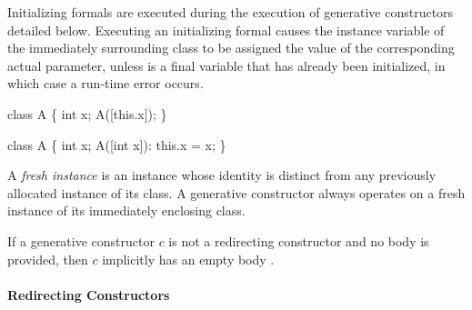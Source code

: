 \documentclass{article}
\begin{document}

\LMHash{}
Initializing formals are executed during the execution of generative constructors detailed below.
Executing an initializing formal  causes the instance variable \id{} of the immediately surrounding class to be assigned the value of the corresponding actual parameter,
unless \id{} is a final variable that has already been initialized, in which case a run-time error occurs.


\begin{dartCode}
class A \{
  int x;
  A([this.x]);
\}
\end{dartCode}


\begin{dartCode}
class A \{
  int x;
  A([int x]): this.x = x;
\}
\end{dartCode}

\LMHash{}
A {\em fresh instance} is an instance whose identity is distinct from any previously allocated instance of its class.
A generative constructor always operates on a fresh instance of its immediately enclosing class.


\LMHash{}
If a generative constructor $c$ is not a redirecting constructor and no body is provided, then $c$ implicitly has an empty body \code{\{\}}.


\paragraph{Redirecting Constructors}
\end{document}
